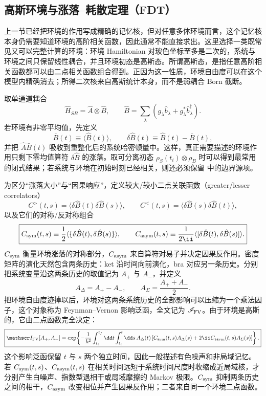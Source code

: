 \subsection{高斯环境与涨落--耗散定理（FDT）}

上一节已经把环境的作用写成精确的记忆核，但对任意多体环境而言，这个记忆核本身仍需要知道环境的高阶相关函数，因此通常不能直接求出。这里选择一类既常见又可以完整计算的环境：环境 Hamiltonian 对玻色坐标至多是二次的，系统与环境之间只保留线性耦合，并且环境初态是高斯态。所谓高斯态，是指任意高阶相关函数都可以由二点相关函数组合得到。正因为这一性质，环境自由度可以在这个模型内精确消去；所得二次核来自高斯统计本身，而不是弱耦合 Born 截断。

取单通道耦合
\[
\hat H_{SB}=\hat A\otimes\hat B,
\qquad
\hat B=\sum_\lambda
(g_\lambda\hat b_\lambda+g_\lambda^*\hat b_\lambda^\dagger).
\]
若环境有非零平均值，先定义
\[
\bar B(t)\equiv\langle\hat B(t)\rangle,
\qquad
\delta\hat B(t)\equiv\hat B(t)-\bar B(t),
\]
并把 $\hat A\bar B(t)$ 吸收到重整化后的系统哈密顿量中。这样，真正需要描述的环境作用只剩下零均值算符 $\delta\hat B$ 的涨落。取可分离初态 $\rho_S(t_i)\otimes\rho_B$ 时可以得到最常用的闭式结果；若系统与环境在初始时刻已经相关，则还必须保留 中的边界源项。

为区分“涨落大小”与“因果响应”，定义较大/较小二点关联函数（greater/lesser correlators）
\[
C^>(t,s)=\langle\delta\hat B(t)\delta\hat B(s)\rangle,
\qquad
C^<(t,s)=\langle\delta\hat B(s)\delta\hat B(t)\rangle,
\]
以及它们的对称/反对称组合
\begin{equation}
\boxed{
C_{\rm sym}(t,s)
\equiv\frac12\langle\{\delta\hat B(t),\delta\hat B(s)\}\rangle,
\qquad
C_{\rm asym}(t,s)
\equiv\frac{1}{2\ii}\langle[\delta\hat B(t),\delta\hat B(s)]\rangle.}
\label{eq:noise_dissipation_kernels_general}
\end{equation}
$C_{\rm sym}$ 衡量环境涨落的对称部分，$C_{\rm asym}$ 来自算符对易子并决定因果反作用。密度矩阵的演化天然包含两条历史：ket 沿时间向前演化，bra 对应另一条历史。分别把系统变量沿这两条历史的取值记为 $A_+$ 与 $A_-$，并定义
\[
A_\Delta=A_+-A_-,
\qquad
A_\Sigma=\frac{A_++A_-}{2}.
\]
把环境自由度迹掉以后，环境对这两条系统历史的全部影响可以压缩为一个乘法因子，这个对象称为 Feynman--Vernon 影响泛函，全文记为 $\mathscr I_{\rm FV}$。由于环境是高斯的，它由二点函数完全决定：
\begin{equation}
\boxed{
\mathscr I_{\rm FV}[A_+,A_-]
=\exp\!\left\{-\frac{1}{\hbar^2}
\int_{t_i}^{t_f}\dd t\int_{t_i}^{t}\dd s\,
A_\Delta(t)
\left[C_{\rm sym}(t,s)A_\Delta(s)+2\ii C_{\rm asym}(t,s)A_\Sigma(s)\right]
\right\}.}
\label{eq:gaussian_feynman_vernon_influence}
\end{equation}
这个影响泛函保留 $t$ 与 $s$ 两个独立时间，因此一般描述有色噪声和非局域记忆。若 $C_{\rm sym}(t,s)$、$C_{\rm asym}(t,s)$ 在相关时间远短于系统时间尺度时收缩成近局域核，才分别产生白噪声、指数型退相干或局域摩擦的 Markov 极限。$C_{\rm sym}$ 抑制两条历史之间的相干，$C_{\rm asym}$ 改变相位并产生因果反作用；二者来自同一个环境二点函数。

